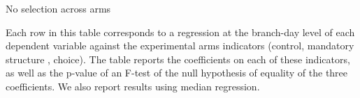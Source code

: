 \documentclass[12pt, a4paper, colorinlistoftodos]{article}
\begin{document}

\begin{table}[H]
\caption{No selection across arms}
\label{attrition_table_final}
\begin{center}
\resizebox{0.65\textwidth}{!}{
\footnotesize{}
}
\end{center}
\scriptsize{Each row in this table 
 corresponds to a regression at the branch-day level of each dependent variable against the experimental arms indicators (control, mandatory structure , choice). The table reports the coefficients on each of these indicators, as well as the p-value of an F-test of the null hypothesis of equality of the three coefficients. We also report results using median regression. %
 }
\end{table}


\end{document}
